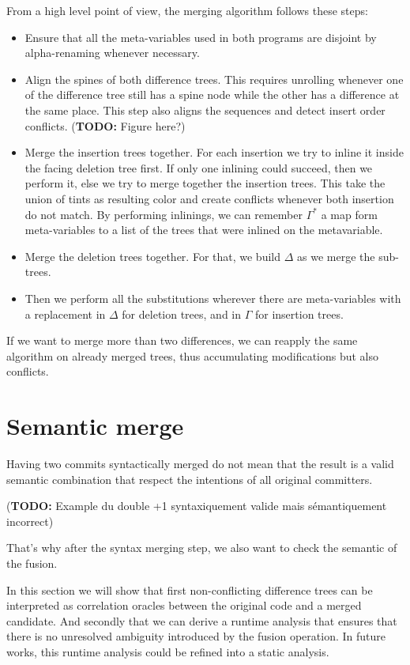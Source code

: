 \documentclass[a4paper,11pt]{article}
\newcommand\todo[1]{{\color{teal}(\textbf{TODO:} #1)}}
\begin{document}
From a high level point of view, the merging algorithm follows these steps:
\begin{itemize}
 \item Ensure that all the meta-variables used in both programs are disjoint by alpha-renaming whenever necessary.
 \item Align the spines of both difference trees. This requires unrolling whenever one of the difference tree still has a spine node while the other has a difference at the same place. This step also aligns the sequences and detect insert order conflicts. \todo{Figure here?}
 \item Merge the insertion trees together. For each insertion we try to inline it inside the facing deletion tree first. If only one inlining could succeed, then we perform it, else we try to merge together the insertion trees. This take the union of tints as resulting color and create conflicts whenever both insertion do not match. By performing inlinings, we can remember $\Gamma^*$ a map form meta-variables to a list of the trees that were inlined on the metavariable.
 \item Merge the deletion trees together. For that, we build $\Delta$ as we merge the sub-trees.
 \item Then we perform all the substitutions wherever there are meta-variables with a replacement in $\Delta$ for deletion trees, and in $\Gamma$ for insertion trees.
\end{itemize}

If we want to merge more than two differences, we can reapply the same algorithm on already merged trees, thus accumulating modifications but also conflicts.

\section{Semantic merge}
\label{sec:semantic-merge}

Having two commits syntactically merged do not mean that the result is a valid semantic combination that respect the intentions of all original committers.

\todo{Example du double +1 syntaxiquement valide mais sémantiquement incorrect}

That's why after the syntax merging step, we also want to check the semantic of the fusion.

In this section we will show that first non-conflicting difference trees can be interpreted as correlation oracles between the original code and a merged candidate. And secondly that we can derive a runtime analysis that ensures that there is no unresolved ambiguity introduced by the fusion operation. In future works, this runtime analysis could be refined into a static analysis.
\end{document}
